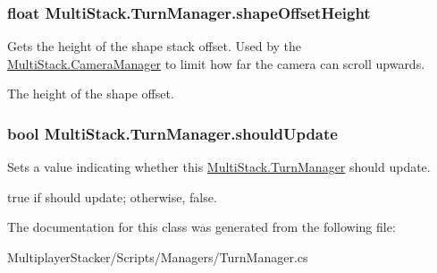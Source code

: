 \subsubsection[{shape\+Offset\+Height}]{\setlength{\rightskip}{0pt plus 5cm}float Multi\+Stack.\+Turn\+Manager.\+shape\+Offset\+Height\hspace{0.3cm}{\ttfamily [get]}}\label{class_multi_stack_1_1_turn_manager_a951b024c556f17abe670f53ba30089f1}


Gets the height of the shape stack offset. Used by the \hyperlink{class_multi_stack_1_1_camera_manager}{Multi\+Stack.\+Camera\+Manager} to limit how far the camera can scroll upwards. 

The height of the shape offset.\hypertarget{class_multi_stack_1_1_turn_manager_a623b9a24f294fbbaa819e9149f9f0135}{}
\subsubsection[{should\+Update}]{\setlength{\rightskip}{0pt plus 5cm}bool Multi\+Stack.\+Turn\+Manager.\+should\+Update\hspace{0.3cm}{\ttfamily [set]}}\label{class_multi_stack_1_1_turn_manager_a623b9a24f294fbbaa819e9149f9f0135}


Sets a value indicating whether this \hyperlink{class_multi_stack_1_1_turn_manager}{Multi\+Stack.\+Turn\+Manager} should update. 

{\ttfamily true} if should update; otherwise, {\ttfamily false}.

The documentation for this class was generated from the following file\+:\begin{DoxyCompactItemize}
\item 
Multiplayer\+Stacker/\+Scripts/\+Managers/Turn\+Manager.\+cs\end{DoxyCompactItemize}
